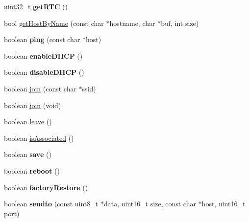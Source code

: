 \begin{DoxyCompactItemize}
\item 
\hypertarget{class_wi_fly_a2edf7992233417b0b7a152998c237b69}{
uint32\-\_\-t {\bfseries get\-R\-T\-C} ()}
\label{class_wi_fly_a2edf7992233417b0b7a152998c237b69}

\item 
bool \hyperlink{class_wi_fly_a2051052a072928e2ba37bd93cc3e3c20}{get\-Host\-By\-Name} (const char $\ast$hostname, char $\ast$buf, int size)
\item 
\hypertarget{class_wi_fly_a42af2ee53a70b6dc2c0292f80cde5d53}{
boolean {\bfseries ping} (const char $\ast$host)}
\label{class_wi_fly_a42af2ee53a70b6dc2c0292f80cde5d53}

\item 
\hypertarget{class_wi_fly_ae1154cd2b635e9dfa15d6d2c864fe7ae}{
boolean {\bfseries enable\-D\-H\-C\-P} ()}
\label{class_wi_fly_ae1154cd2b635e9dfa15d6d2c864fe7ae}

\item 
\hypertarget{class_wi_fly_a2e593b9f61123bb7c2ea33819d7be920}{
boolean {\bfseries disable\-D\-H\-C\-P} ()}
\label{class_wi_fly_a2e593b9f61123bb7c2ea33819d7be920}

\item 
boolean \hyperlink{class_wi_fly_a4b1847c349f422439aaa74034fdfbe34}{join} (const char $\ast$ssid)
\item 
boolean \hyperlink{class_wi_fly_afa926831f05ea8ed7a94ee01b8b5636f}{join} (void)
\item 
boolean \hyperlink{class_wi_fly_ac05d1f877b0b40d53cdedb7ad5065ab2}{leave} ()
\item 
boolean \hyperlink{class_wi_fly_abcf1fa74650fcfa4d0cbddfa289d3cd4}{is\-Associated} ()
\item 
\hypertarget{class_wi_fly_a2fd8dc483004913d7d2eb36ea6a138ce}{
boolean {\bfseries save} ()}
\label{class_wi_fly_a2fd8dc483004913d7d2eb36ea6a138ce}

\item 
\hypertarget{class_wi_fly_aa64722671a775b2cbbbb031395397505}{
boolean {\bfseries reboot} ()}
\label{class_wi_fly_aa64722671a775b2cbbbb031395397505}

\item 
\hypertarget{class_wi_fly_acb22ff2535fb4cdb14fa76a225da918c}{
boolean {\bfseries factory\-Restore} ()}
\label{class_wi_fly_acb22ff2535fb4cdb14fa76a225da918c}

\item 
\hypertarget{class_wi_fly_a635f8ce5f71b13285cbd3c713b2f19c6}{
boolean {\bfseries sendto} (const uint8\-\_\-t $\ast$data, uint16\-\_\-t size, const char $\ast$host, uint16\-\_\-t port)}
\label{class_wi_fly_a635f8ce5f71b13285cbd3c713b2f19c6}


\end{DoxyCompactItemize}
